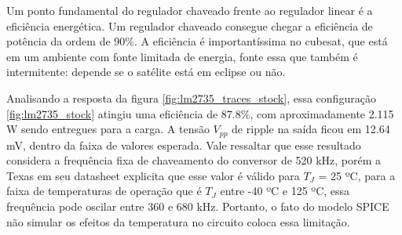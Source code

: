 \noindent
\begin{minipage}{\linewidth}
\label{fig:lm2735_traces_stock}
\end{minipage}

Um ponto fundamental do regulador chaveado frente ao regulador linear é a eficiência energética. Um regulador chaveado consegue chegar a eficiência de potência da ordem de 90\%. A eficiência é importantíssima no cubesat, que está em um ambiente com fonte limitada de energia, fonte essa que também é intermitente: depende se o satélite está em eclipse ou não.

Analisando a resposta da figura \ref{fig:lm2735_traces_stock}, essa configuração \ref{fig:lm2735_stock} atingiu uma eficiência de 87.8\%, com aproximadamente 2.115 W sendo entregues para a carga.
A tensão $V_{pp}$ de ripple na saída ficou em 12.64 mV, dentro da faixa de valores esperada. Vale ressaltar que esse resultado considera a frequência fixa de chaveamento do conversor de 520 kHz, porém a Texas em seu datasheet explicita que esse valor é válido para $T_{J}$ = 25 ºC, para a faixa de temperaturas de operação que é $T_{J}$ entre -40 ºC e 125 ºC, essa frequência pode oscilar entre 360 e 680 kHz. Portanto, o fato do modelo SPICE não simular os efeitos da temperatura no circuito coloca essa limitação.

